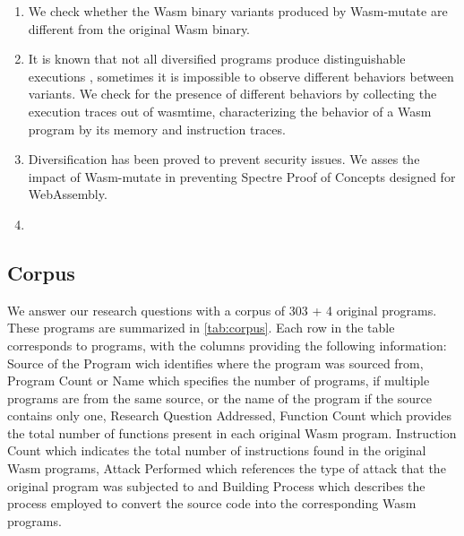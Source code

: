 \documentclass[sigplan,screen]{acmart}
\newcommand{\tool}{Wasm-mutate\xspace}
\newcommand{\wasm}{Wasm\xspace}
\newcommand{\Wasm}{WebAssembly\xspace}
\begin{document}
\begin{enumerate}[label=RQ\arabic*:, ref=RQ\arabic*]
     \item \label{rq:static} \textbf{\rqstatic}
        We  check whether the \wasm binary variants produced by \tool are different from the original \wasm binary. %
    
    \item \label{rq:dynamic}\textbf{\rqdynamic} 
        It is known that not all diversified programs produce distinguishable executions \cite{crane2015thwarting}, sometimes it is impossible to observe different behaviors between variants. 
        We check for the presence of different behaviors by collecting the execution traces out of wasmtime, characterizing the behavior of a \wasm program by its memory and instruction traces.
        
    \item \label{rq:defensive}\textbf{\rqdefensive} 
     \label{rq:performance} Diversification has been proved to prevent security issues. We asses the impact of \tool in preventing Spectre Proof of Concepts designed for \Wasm.

    \item \label{rq:testing}\textbf{\rqtesting} 
    
    
\end{enumerate}

\subsection{Corpus}
\label{sec:corpus}



We answer our research questions with a corpus of 303 + 4 original programs.
These programs are summarized in \autoref{tab:corpus}.
Each row in the table corresponds to programs, with the columns providing the following information: Source of the Program wich identifies where the program was sourced from, Program Count or Name which specifies the number of programs, if multiple programs are from the same source, or the name of the program if the source contains only one, Research Question Addressed, Function Count which provides the total number of functions present in each original \wasm program. Instruction Count which indicates the total number of instructions found in the original \wasm programs, Attack Performed which references the type of attack that the original program was subjected to and Building Process which describes the process employed to convert the source code into the corresponding \wasm programs.
\end{document}
